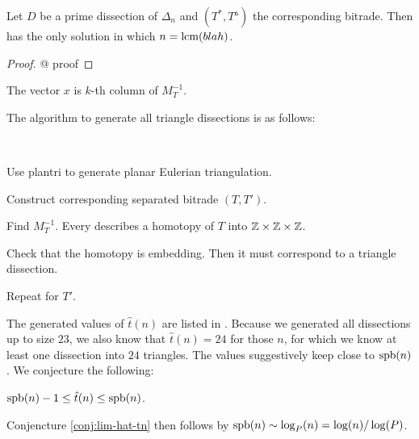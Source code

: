 \begin{lem}
Let $D$ be a prime dissection of $\Delta_n$ and $(T^*, T^\vartriangle)$ the corresponding bitrade. Then
%
has the only solution in which $n = \mathop{\mathrm{lcm}}(blah)$.
\end{lem}
\begin{proof}
@ proof
\end{proof}

\begin{cor}
The vector $x$ is $k$-th column of $M_T^{-1}$.
\end{cor}%

The algorithm to generate all triangle dissections is as follows:

\begin{alg}\ 
\begin{cosyenumerate}
	\item Use plantri to generate planar Eulerian triangulation.
	\item Construct corresponding separated bitrade $(T,T')$.
	\item Find $M_T^{-1}$. Every  describes a homotopy of $T$ into $\mathbb Z\times\mathbb Z\times\mathbb Z$.
	\item Check that the homotopy is embedding. Then it must correspond to a triangle dissection.
	\item Repeat for $T'$.
\end{cosyenumerate}
\end{alg}%

The generated values of $\hat t(n)$ are listed in . Because we generated all dissections up to size $23$, we also know that $\hat t(n) = 24$ for those $n$, for which we know at least one dissection into $24$ triangles. The values suggestively keep close to $\mathop{\mathrm{spb}}(n)$. We conjecture the following:

\begin{conj} $\mathop{\mathrm{spb}}(n)-1 \leq \hat t(n) \leq \mathop{\mathrm{spb}}(n)$.
\end{conj}%

Conjencture \ref{conj:lim-hat-tn} then follows by $\mathop{\mathrm{spb}}(n) \sim \log_P(n) = \log(n)/\log(P)$.



